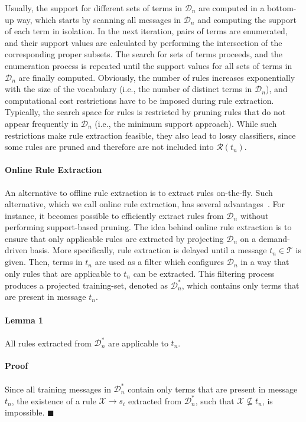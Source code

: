 \documentclass{sig-alternate}
\begin{document}
Usually, the support for different sets of terms in $\mathcal{D}_n$ are computed in a bottom-up way, which
starts by scanning all messages in $\mathcal{D}_n$
and computing the support of each term in isolation.
In the next iteration,
pairs of terms are enumerated, and their support values are calculated by performing the intersection of the corresponding proper subsets.
The search for sets of terms proceeds, and the enumeration process is repeated until the support values for all sets of terms in $\mathcal{D}_n$ are finally computed.
Obviously, the number of rules increases exponentially with the size of the vocabulary (i.e., the number of distinct terms in $\mathcal{D}_n$), and
computational cost restrictions have to be imposed during
rule extraction. Typically, the search space for rules is restricted by pruning
rules that do not appear frequently in $\mathcal{D}_n$ (i.e., the minimum support approach). While such restrictions make rule extraction feasible, they also lead to lossy classifiers, since some rules are pruned and therefore are not included into $\mathcal{R}(t_n)$.

\paragraph*{\bf{Online Rule Extraction}}
An alternative to offline rule extraction is to extract rules on-the-fly. Such alternative, which we call online rule extraction, has several advantages~\cite{sigir}. For instance, it becomes possible to efficiently extract rules from $\mathcal{D}_n$ without performing support-based pruning.
The idea behind online rule extraction is to ensure that only applicable rules are extracted by projecting $\mathcal{D}_n$ on a demand-driven basis. More specifically, rule extraction is delayed until a message $t_n\in\mathcal{T}$ is given. Then, terms in $t_n$ are used as a filter which configures $\mathcal{D}_n$ in a way that only rules that are applicable to $t_n$ can be extracted. This filtering process produces a projected training-set, denoted as $\mathcal{D}^{*}_n$, which contains only terms that are present in message $t_n$.

\paragraph*{\bf{Lemma 1}}
All rules extracted from $\mathcal{D}^{*}_n$ are applicable to $t_n$.

\paragraph*{\bf{Proof}}
Since all training messages in $\mathcal{D}^{*}_n$ contain only terms that are
present in message $t_n$, the existence of a rule
$\mathcal{X}\xrightarrow{}s_i$ extracted from $\mathcal{D}^{*}_n$, such that
$\mathcal{X}\nsubseteq t_n$, is impossible. $\blacksquare$\\
\end{document}
